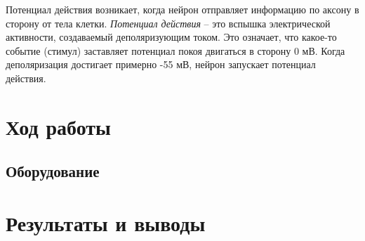 \documentclass{article}
\begin{document}
        Потенциал действия возникает, когда нейрон отправляет информацию по
        аксону в сторону от тела клетки. \textit{Потенциал действия} – это вспышка электрической
        активности, создаваемый деполяризующим током. Это означает, что какое-то
        событие (стимул) заставляет потенциал покоя двигаться в сторону 0 мВ. Когда
        деполяризация достигает примерно -55 мВ, нейрон запускает потенциал действия.
        \newpage

    \section*{Ход работы}

        \subsection*{Оборудование}



    \section*{Результаты и выводы}
\end{document}
